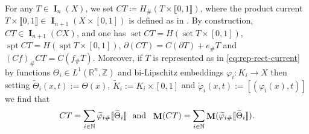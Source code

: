 \documentclass[reqno]{amsart}
\numberwithin{equation}{section}
\newcommand{\N}{\mathbb{N}}
\newcommand{\spt}{\operatorname{spt}}
\newcommand{\bb}[1]{\llbracket #1\rrbracket}
\DeclareMathOperator{\mass}{\mathbf{M}}
\DeclareMathOperator{\bI}{\mathbf{I}}
\DeclareMathOperator{\set}{set}
\begin{document}
For any $T\in \bI_n(X)$, we set \(CT\coloneqq H_\#( T\times \bb{0,1})\), where the product current \(T\times \bb{0,1}\in \bI_{n+1}(X\times [0,1])\) is defined as in \cite[Section 3.3]{basso2021undistorted}. By construction, $CT\in \bI_{n+1}(CX)$, and one has $\set CT=H(\set T\times [0,1])$, $\spt CT=H(\spt T\times [0,1])$, \(\partial (CT)= C(\partial T)+e_\# T\) and \((Cf)_\#CT=C(f_\#T)\). Moreover, if $T$ is represented as in \eqref{eq:rep-rect-current} by functions $\Theta_i\in L^{1}(\mathbb{R}^n,\mathbb{Z})$ and bi-Lipschitz embeddings $\varphi_i\colon K_i \to X$ then setting $\widetilde{\Theta}_i(x,t):=\Theta(x)$, $\widetilde{K}_i:=K_i\times[0,1]$ and $\widetilde{\varphi}_i(x,t):=[(\varphi_i(x),t)]$ we find that
\begin{equation}
\label{eq:cone-decomp}
    CT=\sum_{i\in \N} \widetilde{\varphi}_{i\#} \bb{\widetilde{\Theta}_i} \ \ \textnormal{and} \ \ \mass(CT)=\sum_{i\in \N} \mass (\widetilde{\varphi}_{i\#} \bb{\widetilde{\Theta}_i}).
\end{equation}
\end{document}
